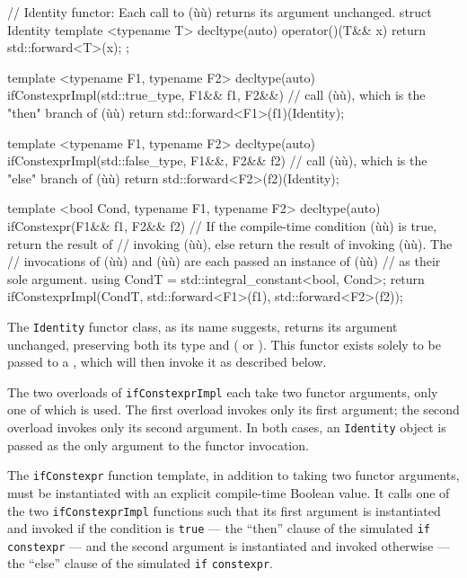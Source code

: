 {\begin{emcppslisting}[emcppsbatch=e7,emcppsstandards={c++14}]
// Identity functor: Each call to (ù{}ù) returns its argument unchanged.
struct Identity
{
    template <typename T>
    decltype(auto) operator()(T&& x) { return std::forward<T>(x); }
};

template <typename F1, typename F2>
decltype(auto) ifConstexprImpl(std::true_type, F1&& f1, F2&&)
    // call (ù{}ù), which is the "then" branch of (ù{}ù)
{
    return std::forward<F1>(f1)(Identity{});
}

template <typename F1, typename F2>
decltype(auto) ifConstexprImpl(std::false_type, F1&&, F2&& f2)
    // call (ù{}ù), which is the "else" branch of (ù{}ù)
{
    return std::forward<F2>(f2)(Identity{});
}

template <bool Cond, typename F1, typename F2>
decltype(auto) ifConstexpr(F1&& f1, F2&& f2)
    // If the compile-time condition (ù{}ù) is true, return the result of
    // invoking (ù{}ù), else return the result of invoking (ù{}ù).  The
    // invocations of (ù{}ù) and (ù{}ù) are each passed an instance of (ù{}ù)
    // as their sole argument.
{
    using CondT = std::integral_constant<bool, Cond>;
    return ifConstexprImpl(CondT{}, std::forward<F1>(f1), std::forward<F2>(f2));
}
\end{emcppslisting}
    

\noindent The \lstinline!Identity! functor class, as its name suggests, returns its
argument unchanged, preserving both its type and 
( or ). This functor exists solely to be
passed to a , which will then invoke it as
described below.

The two overloads of \lstinline!ifConstexprImpl! each take two functor
arguments, only one of which is used. The first overload invokes only
its first argument; the second overload invokes only its second
argument. In both cases, an \lstinline!Identity! object is passed as the
only argument to the functor invocation.

The \lstinline!ifConstexpr! function template, in addition to taking two
functor arguments, must be instantiated with an explicit compile-time
Boolean value. It calls one of the two \lstinline!ifConstexprImpl!
functions such that its first argument is instantiated and invoked if
the condition is \lstinline!true! --- the ``then'' clause of the simulated
\lstinline!if! \lstinline!constexpr! --- and the second argument is
instantiated and invoked otherwise --- the ``else'' clause of the
simulated \lstinline!if! \lstinline!constexpr!.

}
